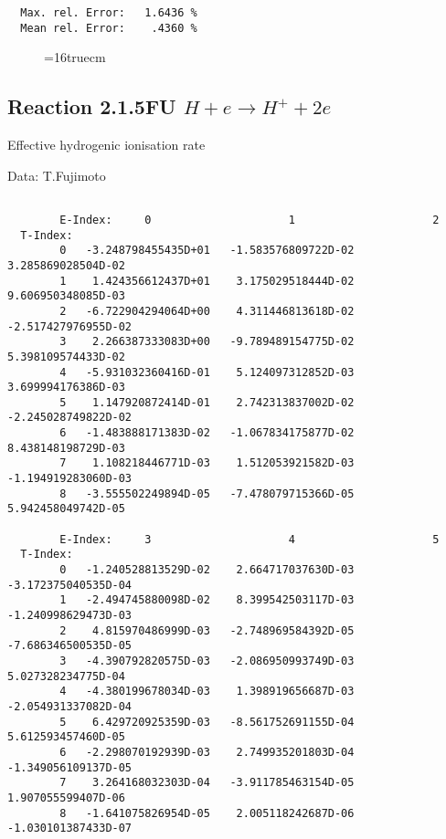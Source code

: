 \documentclass[12pt]{article}
\begin{document}
\begin{small}
\begin{verbatim}
  Max. rel. Error:   1.6436 %
  Mean rel. Error:    .4360 %
\end{verbatim}\end{small}
\begin{figure} \label{2.1.5o}
\epsfxsize=16truecm
\end{figure}
\newpage

\subsection{
Reaction 2.1.5FU $H + e \rightarrow H^+ + 2e $
}


   Effective hydrogenic ionisation rate

   Data: T.Fujimoto

\begin{small}\begin{verbatim}

        E-Index:     0                     1                     2
  T-Index:
        0   -3.248798455435D+01   -1.583576809722D-02    3.285869028504D-02
        1    1.424356612437D+01    3.175029518444D-02    9.606950348085D-03
        2   -6.722904294064D+00    4.311446813618D-02   -2.517427976955D-02
        3    2.266387333083D+00   -9.789489154775D-02    5.398109574433D-02
        4   -5.931032360416D-01    5.124097312852D-03    3.699994176386D-03
        5    1.147920872414D-01    2.742313837002D-02   -2.245028749822D-02
        6   -1.483888171383D-02   -1.067834175877D-02    8.438148198729D-03
        7    1.108218446771D-03    1.512053921582D-03   -1.194919283060D-03
        8   -3.555502249894D-05   -7.478079715366D-05    5.942458049742D-05

        E-Index:     3                     4                     5
  T-Index:
        0   -1.240528813529D-02    2.664717037630D-03   -3.172375040535D-04
        1   -2.494745880098D-02    8.399542503117D-03   -1.240998629473D-03
        2    4.815970486999D-03   -2.748969584392D-05   -7.686346500535D-05
        3   -4.390792820575D-03   -2.086950993749D-03    5.027328234775D-04
        4   -4.380199678034D-03    1.398919656687D-03   -2.054931337082D-04
        5    6.429720925359D-03   -8.561752691155D-04    5.612593457460D-05
        6   -2.298070192939D-03    2.749935201803D-04   -1.349056109137D-05
        7    3.264168032303D-04   -3.911785463154D-05    1.907055599407D-06
        8   -1.641075826954D-05    2.005118242687D-06   -1.030101387433D-07


\end{verbatim}
\end{small}
\end{document}
